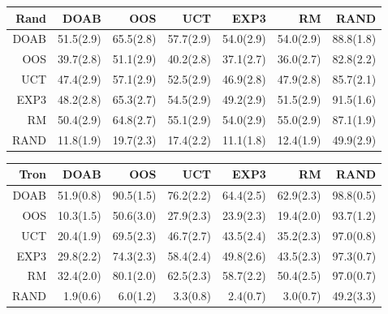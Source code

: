 \begin{figure}
\begin{footnotesize}
\begin{tabular}{|r|rrrrrr|}
\end{tabular}
\begin{tabular}{|r|rrrrrr|}\hline
Rand&DOAB&OOS&UCT&EXP3&RM&RAND\\\hline
DOAB&51.5(2.9)&65.5(2.8)&57.7(2.9)&54.0(2.9)&54.0(2.9)&88.8(1.8)\\
OOS&39.7(2.8)&51.1(2.9)&40.2(2.8)&37.1(2.7)&36.0(2.7)&82.8(2.2)\\
UCT&47.4(2.9)&57.1(2.9)&52.5(2.9)&46.9(2.8)&47.9(2.8)&85.7(2.1)\\
EXP3&48.2(2.8)&65.3(2.7)&54.5(2.9)&49.2(2.9)&51.5(2.9)&91.5(1.6)\\
RM&50.4(2.9)&64.8(2.7)&55.1(2.9)&54.0(2.9)&55.0(2.9)&87.1(1.9)\\
RAND&11.8(1.9)&19.7(2.3)&17.4(2.2)&11.1(1.8)&12.4(1.9)&49.9(2.9)\\
\hline
\end{tabular}
\begin{tabular}{|r|rrrrrr|}\hline
Tron&DOAB&OOS&UCT&EXP3&RM&RAND\\\hline
DOAB&51.9(0.8)&90.5(1.5)&76.2(2.2)&64.4(2.5)&62.9(2.3)&98.8(0.5)\\
OOS&10.3(1.5)&50.6(3.0)&27.9(2.3)&23.9(2.3)&19.4(2.0)&93.7(1.2)\\
UCT&20.4(1.9)&69.5(2.3)&46.7(2.7)&43.5(2.4)&35.2(2.3)&97.0(0.8)\\
EXP3&29.8(2.2)&74.3(2.3)&58.4(2.4)&49.8(2.6)&43.5(2.3)&97.3(0.7)\\
RM&32.4(2.0)&80.1(2.0)&62.5(2.3)&58.7(2.2)&50.4(2.5)&97.0(0.7)\\
RAND&1.9(0.6)&6.0(1.2)&3.3(0.8)&2.4(0.7)&3.0(0.7)&49.2(3.3)\\
\hline
\end{tabular}
\begin{tabular}{|r|rrrrrr|}\hline

\end{tabular}
\end{footnotesize}
\end{figure}
